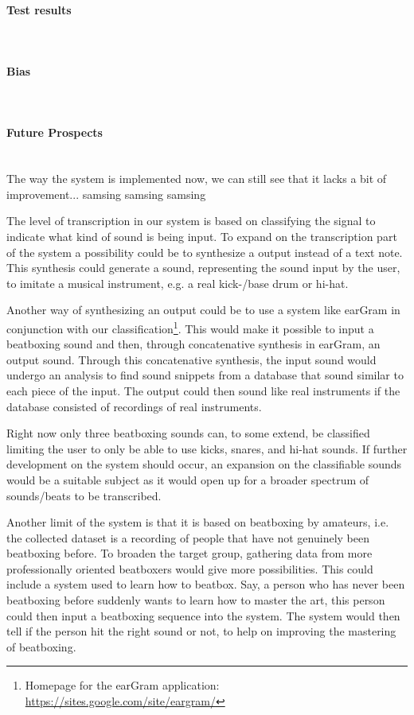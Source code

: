 \paragraph{Test results} \hspace{0pt} \\


\paragraph{Bias} \hspace{0pt} \\


\paragraph{Future Prospects} \hspace{0pt} \\
The way the system is implemented now, we can still see that it lacks a bit of improvement... samsing samsing samsing

The level of transcription in our system is based on classifying the signal to indicate what kind of sound is being input. To expand on the transcription part of the system a possibility could be to synthesize a output instead of a text note. This synthesis could generate a sound, representing the sound input by the user, to imitate a musical instrument, e.g. a real kick-/base drum or hi-hat.

Another way of synthesizing an output could be to use a system like earGram in conjunction with our classification\footnote{Homepage for the earGram application: \url{https://sites.google.com/site/eargram/}}. This would make it possible to input a beatboxing sound and then, through concatenative synthesis in earGram, an output sound. Through this concatenative synthesis, the input sound would undergo an analysis to find sound snippets from a database that sound similar to each piece of the input. The output could then sound like real instruments if the database consisted of recordings of real instruments.

Right now only three beatboxing sounds can, to some extend, be classified limiting the user to only be able to use kicks, snares, and hi-hat sounds. If further development on the system should occur, an expansion on the classifiable sounds would be a suitable subject as it would open up for a broader spectrum of sounds/beats to be transcribed.

Another limit of the system is that it is based on beatboxing by amateurs, i.e. the collected dataset is a recording of people that have not genuinely been beatboxing before. To broaden the target group, gathering data from more professionally oriented beatboxers would give more possibilities. This could include a system used to learn how to beatbox. Say, a person who has never been beatboxing before suddenly wants to learn how to master the art, this person could then input a beatboxing sequence into the system. The system would then tell if the person hit the right sound or not, to help on improving the mastering of beatboxing.

